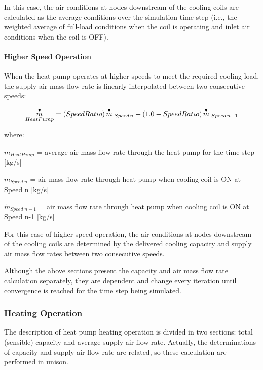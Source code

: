 In this case, the air conditions at nodes downstream of the cooling coils are calculated as the average conditions over the simulation time step (i.e., the weighted average of full-load conditions when the coil is operating and inlet air conditions when the coil is OFF).

\paragraph{Higher Speed Operation}\label{higher-speed-operation-1}

When the heat pump operates at higher speeds to meet the required cooling load, the supply air mass flow rate is linearly interpolated between two consecutive speeds:

\begin{equation}
{\mathop m\limits^ \bullet_{HeatPump}} = (SpeedRatio)\mathop m\limits^ \bullet  {{\kern 1pt}_{Speed{\kern 1pt} n}} + (1.0 - SpeedRatio)\mathop m\limits^ \bullet  {{\kern 1pt}_{Speed{\kern 1pt} n - 1}}
\end{equation}

where:

\({\dot m_{HeatPump}}\) = average air mass flow rate through the heat pump for the time step {[}kg/s{]}

\({\dot m_{Speed\;n}}\) = air mass flow rate through heat pump when cooling coil is ON at Speed n {[}kg/s{]}

\({\dot m_{Speed\;n - 1}}\) = air mass flow rate through heat pump when cooling coil is ON at Speed n-1 {[}kg/s{]}

For this case of higher speed operation, the air conditions at nodes downstream of the cooling coils are determined by the delivered cooling capacity and supply air mass flow rates between two consecutive speeds.

Although the above sections present the capacity and air mass flow rate calculation separately, they are dependent and change every iteration until convergence is reached for the time step being simulated.

\subsubsection{Heating Operation}\label{heating-operation-1}

The description of heat pump heating operation is divided in two sections: total (sensible) capacity and average supply air flow rate. Actually, the determinations of capacity and supply air flow rate are related, so these calculation are performed in unison.

